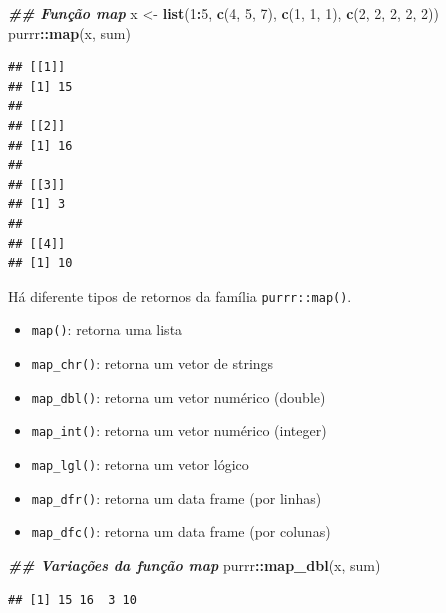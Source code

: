 \documentclass[
]{article}
\newenvironment{Shaded}{\begin{snugshade}}{\end{snugshade}}
\newcommand{\DecValTok}[1]{\textcolor[rgb]{0.00,0.00,0.81}{#1}}
\newcommand{\DocumentationTok}[1]{\textcolor[rgb]{0.56,0.35,0.01}{\textbf{\textit{#1}}}}
\newcommand{\FunctionTok}[1]{\textcolor[rgb]{0.13,0.29,0.53}{\textbf{#1}}}
\newcommand{\NormalTok}[1]{#1}
\newcommand{\OtherTok}[1]{\textcolor[rgb]{0.56,0.35,0.01}{#1}}
\newcommand{\SpecialCharTok}[1]{\textcolor[rgb]{0.81,0.36,0.00}{\textbf{#1}}}
\providecommand{\tightlist}{%
  \setlength{\itemsep}{0pt}\setlength{\parskip}{0pt}}
\begin{document}
\begin{Shaded}
\begin{Highlighting}[]
\DocumentationTok{\#\# Função map}
\NormalTok{x }\OtherTok{\textless{}{-}} \FunctionTok{list}\NormalTok{(}\DecValTok{1}\SpecialCharTok{:}\DecValTok{5}\NormalTok{, }\FunctionTok{c}\NormalTok{(}\DecValTok{4}\NormalTok{, }\DecValTok{5}\NormalTok{, }\DecValTok{7}\NormalTok{), }\FunctionTok{c}\NormalTok{(}\DecValTok{1}\NormalTok{, }\DecValTok{1}\NormalTok{, }\DecValTok{1}\NormalTok{), }\FunctionTok{c}\NormalTok{(}\DecValTok{2}\NormalTok{, }\DecValTok{2}\NormalTok{, }\DecValTok{2}\NormalTok{, }\DecValTok{2}\NormalTok{, }\DecValTok{2}\NormalTok{))}
\NormalTok{purrr}\SpecialCharTok{::}\FunctionTok{map}\NormalTok{(x, sum)}
\end{Highlighting}
\end{Shaded}

\begin{verbatim}
## [[1]]
## [1] 15
## 
## [[2]]
## [1] 16
## 
## [[3]]
## [1] 3
## 
## [[4]]
## [1] 10
\end{verbatim}

Há diferente tipos de retornos da família \texttt{purrr::map()}.

\begin{itemize}
\tightlist
\item
  \texttt{map()}: retorna uma lista
\item
  \texttt{map\_chr()}: retorna um vetor de strings
\item
  \texttt{map\_dbl()}: retorna um vetor numérico (double)
\item
  \texttt{map\_int()}: retorna um vetor numérico (integer)
\item
  \texttt{map\_lgl()}: retorna um vetor lógico
\item
  \texttt{map\_dfr()}: retorna um data frame (por linhas)
\item
  \texttt{map\_dfc()}: retorna um data frame (por colunas)
\end{itemize}

\begin{Shaded}
\begin{Highlighting}[]
\DocumentationTok{\#\# Variações da função map}
\NormalTok{purrr}\SpecialCharTok{::}\FunctionTok{map\_dbl}\NormalTok{(x, sum)}
\end{Highlighting}
\end{Shaded}

\begin{verbatim}
## [1] 15 16  3 10
\end{verbatim}
\end{document}
